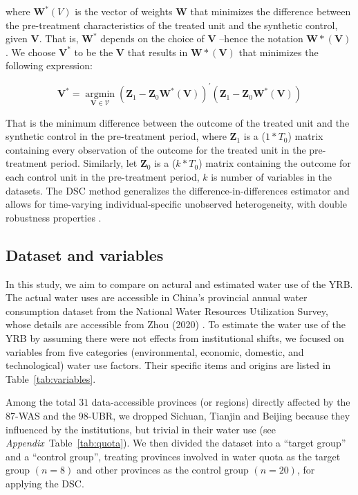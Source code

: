 where $\mathbf{W}^{*}(V)$ is the vector of weights $\mathbf{W}$ that minimizes the difference between the pre-treatment characteristics of the treated unit and the synthetic control, given $\mathbf{V}$. That is, $\mathbf{W^{*}}$ depends on the choice of $\mathbf{V}$ –hence the notation $\mathbf{W*(V)}$. We choose $\mathbf{V^{*}}$ to be the $\mathbf{V}$ that results in $\mathbf{W*(V)}$ that minimizes the following expression:

\begin{equation}
    \mathbf{V}^{*}=\underset{\mathbf{V} \in \mathcal{V}}{\operatorname{argmin}}\left(\mathbf{Z}_{1}-\mathbf{Z}_{0} \mathbf{W}^{*}(\mathbf{V})\right)^{\prime}\left(\mathbf{Z}_{1}-\mathbf{Z}_{0} \mathbf{W}^{*}(\mathbf{V})\right)
\end{equation}

That is the minimum difference between the outcome of the treated unit and the synthetic control in the pre-treatment period, where $\mathbf{Z}_{1}$ is a ($1*T_0$) matrix containing every observation of the outcome for the treated unit in the pre-treatment period. Similarly, let $\mathbf{Z}_{0}$ is a ($k * T_0$) matrix containing the outcome for each control unit in the pre-treatment period, $k$ is number of variables in the datasets.
The DSC method generalizes the difference-in-differences estimator and allows for time-varying individual-specific unobserved heterogeneity, with double robustness properties \cite{billmeier2013, smith2015}.

\subsection{Dataset and variables}\label{sec:dataset}
In this study, we aim to compare on actural and estimated water use of the YRB.
The actual water uses are accessible in China’s provincial annual water consumption dataset from the National Water Resources Utilization Survey, whose details are accessible from Zhou (2020) \cite{zhou2020}.
To estimate the water use of the YRB by assuming there were not effects from institutional shifts, we focused on variables from five categories (environmental, economic, domestic, and technological) water use factors. Their specific items and origins are listed in Table~\ref{tab:variables}.

Among the total $31$ data-accessible provinces (or regions) directly affected by the 87-WAS and the 98-UBR, we dropped Sichuan, Tianjin and Beijing because they influenced by the institutions, but trivial in their water use (see \textit{Appendix}~Table~\ref{tab:quota}). We then divided the dataset into a ``target group'' and a ``control group'', treating provinces involved in water quota as the target group $(n=8)$ and other provinces as the control group $(n=20)$, for applying the DSC.

